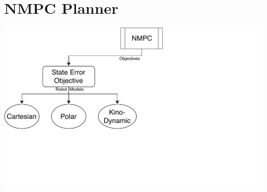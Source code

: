 \section{NMPC Planner}

	\begin{frame}
		\centering
		\includegraphics[scale=0.7]{pictures/mpc_planner_group/mpc_planner_8.pdf}
	\end{frame}

